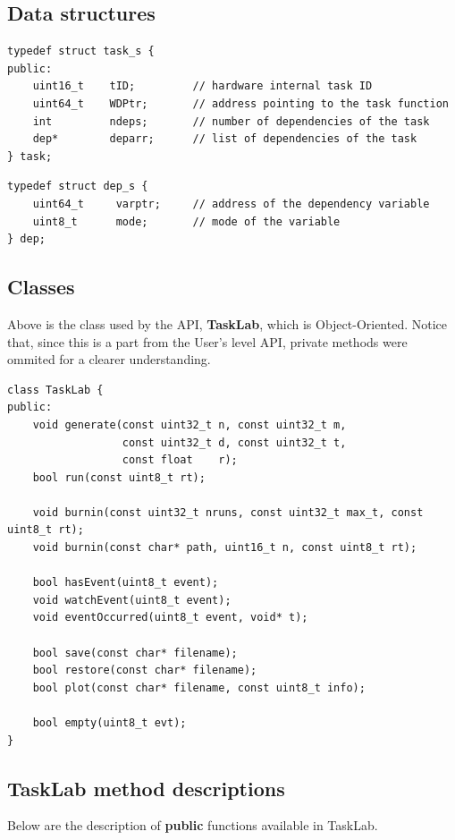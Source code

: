\subsection{Data structures}
\begin{verbatim}
typedef struct task_s {
public:
    uint16_t    tID;         // hardware internal task ID
    uint64_t    WDPtr;       // address pointing to the task function
    int         ndeps;       // number of dependencies of the task
    dep*        deparr;      // list of dependencies of the task
} task;

\end{verbatim}

\begin{verbatim}
typedef struct dep_s {
    uint64_t     varptr;     // address of the dependency variable
    uint8_t      mode;       // mode of the variable 
} dep; 
\end{verbatim}

\subsection{Classes}
Above is the class used by the API, \textbf{TaskLab}, which is Object-Oriented. Notice that, since this is a part from the User's level API, private methods were ommited for a clearer understanding.

\begin{verbatim}
class TaskLab {
public:
    void generate(const uint32_t n, const uint32_t m,
                  const uint32_t d, const uint32_t t,
                  const float    r);
    bool run(const uint8_t rt);

    void burnin(const uint32_t nruns, const uint32_t max_t, const uint8_t rt);
    void burnin(const char* path, uint16_t n, const uint8_t rt);

    bool hasEvent(uint8_t event);
    void watchEvent(uint8_t event);
    void eventOccurred(uint8_t event, void* t);

    bool save(const char* filename);
    bool restore(const char* filename);
    bool plot(const char* filename, const uint8_t info);

    bool empty(uint8_t evt);
}
\end{verbatim}

\subsection{TaskLab method descriptions}
Below are the description of \textbf{public} functions available in TaskLab.

